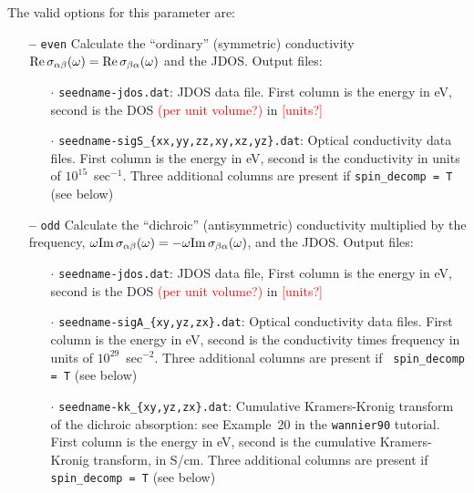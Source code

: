 The valid options for this parameter are:
\begin{itemize}

\item[{\bf --}] \verb#even# Calculate the ``ordinary'' (symmetric)
  conductivity ${\rm Re}\,\sigma_{\alpha\beta}(\omega)={\rm
    Re}\,\sigma_{\beta\alpha}(\omega)$ and the JDOS. Output files:

  \begin{itemize}

  \item[$\cdot$] {\tt seedname-jdos.dat}: JDOS data file. First column is the energy
in eV, second is the DOS \textcolor{red}{(per unit volume?)} in \textcolor{red}{{[units?]}}

  \item[$\cdot$] {\tt seedname-sigS\_\{xx,yy,zz,xy,xz,yz\}.dat}:
    Optical conductivity data files. First column is the energy in eV, second is
the conductivity in units of $10^{15}$~sec$^{-1}$. Three additional columns are present if
{\tt spin\_decomp = T} (see below)

  \end{itemize}

\item[{\bf --}] \verb#odd# Calculate the ``dichroic'' (antisymmetric)
  conductivity multiplied by the frequency, $\omega{\rm
    Im}\,\sigma_{\alpha\beta}(\omega)=-\omega{\rm
    Im}\,\sigma_{\beta\alpha}(\omega)$, and the JDOS. Output files:

  \begin{itemize}

  \item[$\cdot$] {\tt seedname-jdos.dat}: JDOS data file, First column is the energy
in eV, second is the DOS \textcolor{red}{(per unit volume?)} in \textcolor{red}{{[units?]}}

\item[$\cdot$] {\tt seedname-sigA\_\{xy,yz,zx\}.dat}: Optical
  conductivity data files. First column is the energy in eV, second is
  the conductivity times frequency in units of
  $10^{29}$~sec$^{-2}$. Three additional columns are present if {\tt
    spin\_decomp = T} (see below)

\item[$\cdot$] {\tt seedname-kk\_\{xy,yz,zx\}.dat}: Cumulative
  Kramers-Kronig transform of the dichroic absorption: see Example~20
  in the {\tt wannier90} tutorial. First column is the energy in eV,
  second is the cumulative Kramers-Kronig transform, in S/cm. Three
  additional columns are present if {\tt spin\_decomp = T} (see below)

  \end{itemize}


\end{itemize}

